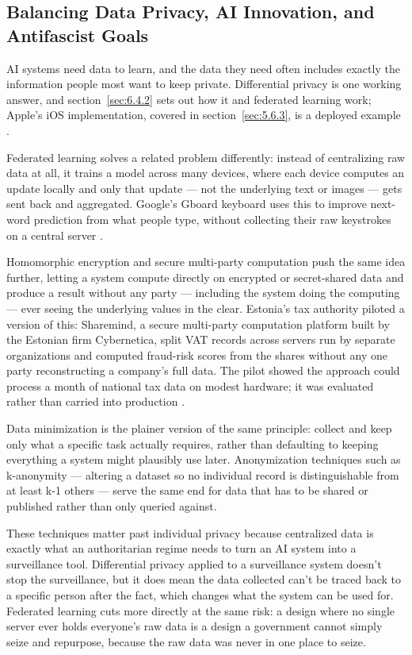 \subsection{Balancing Data Privacy, AI Innovation, and Antifascist Goals}
\label{sec:8.5.1}
AI systems need data to learn, and the data they need often includes exactly the information people most want to keep private. Differential privacy is one working answer, and section~\ref{sec:6.4.2} sets out how it and federated learning work; Apple's iOS implementation, covered in section~\ref{sec:5.6.3}, is a deployed example \autocite{apple2017privacy}.

Federated learning solves a related problem differently: instead of centralizing raw data at all, it trains a model across many devices, where each device computes an update locally and only that update — not the underlying text or images — gets sent back and aggregated. Google's Gboard keyboard uses this to improve next-word prediction from what people type, without collecting their raw keystrokes on a central server \autocite{hard2018federated}.

Homomorphic encryption and secure multi-party computation push the same idea further, letting a system compute directly on encrypted or secret-shared data and produce a result without any party — including the system doing the computing — ever seeing the underlying values in the clear. Estonia's tax authority piloted a version of this: Sharemind, a secure multi-party computation platform built by the Estonian firm Cybernetica, split VAT records across servers run by separate organizations and computed fraud-risk scores from the shares without any one party reconstructing a company's full data. The pilot showed the approach could process a month of national tax data on modest hardware; it was evaluated rather than carried into production \autocite{bogdanov2015taxfraud}.

Data minimization is the plainer version of the same principle: collect and keep only what a specific task actually requires, rather than defaulting to keeping everything a system might plausibly use later. Anonymization techniques such as k-anonymity — altering a dataset so no individual record is distinguishable from at least k-1 others — serve the same end for data that has to be shared or published rather than only queried against.

These techniques matter past individual privacy because centralized data is exactly what an authoritarian regime needs to turn an AI system into a surveillance tool. Differential privacy applied to a surveillance system doesn't stop the surveillance, but it does mean the data collected can't be traced back to a specific person after the fact, which changes what the system can be used for. Federated learning cuts more directly at the same risk: a design where no single server ever holds everyone's raw data is a design a government cannot simply seize and repurpose, because the raw data was never in one place to seize.
